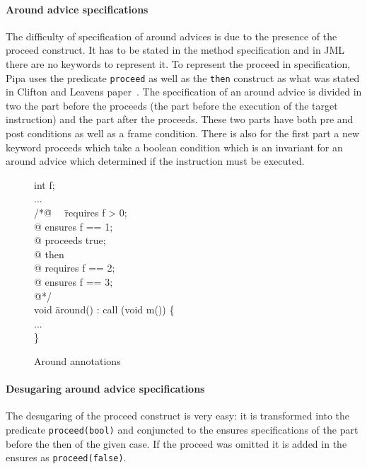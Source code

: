 \paragraph{Around advice specifications} The difficulty of specification of around advices is due to the presence
of the proceed construct. It has to be stated in the method specification and in JML there are no keywords to
represent it. To represent the proceed in specification, Pipa uses the predicate {\tt proceed}
as well as the {\tt then} construct as what was stated in Clifton and Leavens paper~\cite{clifton02spectators}.
The specification of an around advice is divided in two the part before the proceeds (the part before the 
execution of the target instruction) and the part after the proceeds. These two parts have both pre and post 
conditions as well as a frame condition. There is also for the first part a new keyword proceeds which take a 
boolean condition which is an invariant for an around advice which determined if the instruction must be executed.

\begin{figure}
\begin{center}\begin{minipage}{3cm}\bcode
int f;\\
...\\
/*\=@ \ \ \=requires f > 0;\+ \\
@ \>ensures f == 1;\\
@ \>proceeds true;\\
@ then\\
@ \> requires f == 2;\\
@ \> ensures f == 3;\\
@*/\-\\
void \= around() : call (void m()) \{\\
\>...\\
\} \ecode\end{minipage}\end{center}
\caption{Around annotations}
\label{arround_annot}
\end{figure}

\paragraph{Desugaring around advice specifications}
The desugaring of the proceed construct is very easy: it is transformed into the predicate {\tt proceed(bool)} and conjuncted
to the ensures specifications of the part before the then of the given case. 
If the proceed was omitted it is added in the ensures as {\tt proceed(false)}.

